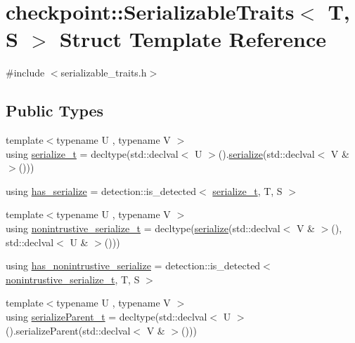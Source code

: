 \hypertarget{structcheckpoint_1_1_serializable_traits}{}\section{checkpoint\+:\+:Serializable\+Traits$<$ T, S $>$ Struct Template Reference}
\label{structcheckpoint_1_1_serializable_traits}


{\ttfamily \#include $<$serializable\+\_\+traits.\+h$>$}

\subsection*{Public Types}
\begin{DoxyCompactItemize}
\item 
{\footnotesize template$<$typename U , typename V $>$ }\\using \hyperlink{structcheckpoint_1_1_serializable_traits_a416ff19cd1038279ace5cb49e3a9fb7d}{serialize\+\_\+t} = decltype(std\+::declval$<$ U $>$().\hyperlink{namespacecheckpoint_a075da4e7344cf037943362517e606c3a}{serialize}(std\+::declval$<$ V \& $>$()))
\item 
using \hyperlink{structcheckpoint_1_1_serializable_traits_ab565b1e56509babb16ea5525ed4a3ebf}{has\+\_\+serialize} = detection\+::is\+\_\+detected$<$ \hyperlink{structcheckpoint_1_1_serializable_traits_a416ff19cd1038279ace5cb49e3a9fb7d}{serialize\+\_\+t}, T, S $>$
\item 
{\footnotesize template$<$typename U , typename V $>$ }\\using \hyperlink{structcheckpoint_1_1_serializable_traits_a3284d2cfd29cfe429d5cf76186d3fe3c}{nonintrustive\+\_\+serialize\+\_\+t} = decltype(\hyperlink{namespacecheckpoint_a075da4e7344cf037943362517e606c3a}{serialize}(std\+::declval$<$ V \& $>$(), std\+::declval$<$ U \& $>$()))
\item 
using \hyperlink{structcheckpoint_1_1_serializable_traits_abc3628bc485acd98b08840fb99450850}{has\+\_\+nonintrustive\+\_\+serialize} = detection\+::is\+\_\+detected$<$ \hyperlink{structcheckpoint_1_1_serializable_traits_a3284d2cfd29cfe429d5cf76186d3fe3c}{nonintrustive\+\_\+serialize\+\_\+t}, T, S $>$
\item 
{\footnotesize template$<$typename U , typename V $>$ }\\using \hyperlink{structcheckpoint_1_1_serializable_traits_a38585e5b9aa0653c08ff48504e922ad5}{serialize\+Parent\+\_\+t} = decltype(std\+::declval$<$ U $>$().serialize\+Parent(std\+::declval$<$ V \& $>$()))

\end{DoxyCompactItemize}
